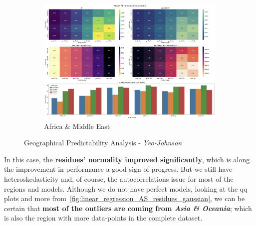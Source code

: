 \documentclass[11pt,english,a4paper,hidelinks]{book}
\begin{document}
\begin{figure}[H]
    \begin{subfigure}[b]{0.48\textwidth}
        \centering
        \includegraphics[width=\textwidth]{images/code/models/linear_regression/second_model/AF - performance.png}
        \caption{Africa \& Middle East}
    \end{subfigure}
    \caption{Geographical Predictability Analysis - \textit{Yeo-Johnson}}
    \label{fig:region_performance_first_model_gaussian}
\end{figure}

\newpage
\noindent In this case, the \textbf{residues' normality improved significantly}, which is along the improvement in performance a good sign of progress. But we still have heteroskedasticity and, of course, the autocorrelations issue for most of the regions and models. Although we do not have perfect models, looking at the \acrshort{qq} plots and more from~\ref{fig:linear_regression_AS_residues_gaussian}, we can be certain that \textbf{most of the outliers are coming from \textit{Asia \& Oceania}}; which is also the region with more data-points in the complete dataset.
\end{document}
